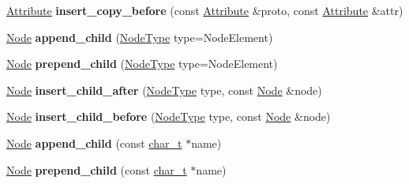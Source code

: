 \begin{DoxyCompactItemize}
\item 
\hypertarget{classphys_1_1xml_1_1Node_af4b5824124e70eda957c410e66123896}{
\hyperlink{classphys_1_1xml_1_1Attribute}{Attribute} {\bfseries insert\_\-copy\_\-before} (const \hyperlink{classphys_1_1xml_1_1Attribute}{Attribute} \&proto, const \hyperlink{classphys_1_1xml_1_1Attribute}{Attribute} \&attr)}
\label{d7/d0a/classphys_1_1xml_1_1Node_af4b5824124e70eda957c410e66123896}

\item 
\hypertarget{classphys_1_1xml_1_1Node_af2601376ae30b9744b3b10067d26de9a}{
\hyperlink{classphys_1_1xml_1_1Node}{Node} {\bfseries append\_\-child} (\hyperlink{namespacephys_1_1xml_a668b0cc666a9d49f7c7222a7552115d3}{NodeType} type=NodeElement)}
\label{d7/d0a/classphys_1_1xml_1_1Node_af2601376ae30b9744b3b10067d26de9a}

\item 
\hypertarget{classphys_1_1xml_1_1Node_ae34bde1d0157fe19996c26099a22695c}{
\hyperlink{classphys_1_1xml_1_1Node}{Node} {\bfseries prepend\_\-child} (\hyperlink{namespacephys_1_1xml_a668b0cc666a9d49f7c7222a7552115d3}{NodeType} type=NodeElement)}
\label{d7/d0a/classphys_1_1xml_1_1Node_ae34bde1d0157fe19996c26099a22695c}

\item 
\hypertarget{classphys_1_1xml_1_1Node_a6c6b4225db38e4f031ee68d5c8c86377}{
\hyperlink{classphys_1_1xml_1_1Node}{Node} {\bfseries insert\_\-child\_\-after} (\hyperlink{namespacephys_1_1xml_a668b0cc666a9d49f7c7222a7552115d3}{NodeType} type, const \hyperlink{classphys_1_1xml_1_1Node}{Node} \&node)}
\label{d7/d0a/classphys_1_1xml_1_1Node_a6c6b4225db38e4f031ee68d5c8c86377}

\item 
\hypertarget{classphys_1_1xml_1_1Node_a36dd60f74bcf0ac054169c3c6ae8e286}{
\hyperlink{classphys_1_1xml_1_1Node}{Node} {\bfseries insert\_\-child\_\-before} (\hyperlink{namespacephys_1_1xml_a668b0cc666a9d49f7c7222a7552115d3}{NodeType} type, const \hyperlink{classphys_1_1xml_1_1Node}{Node} \&node)}
\label{d7/d0a/classphys_1_1xml_1_1Node_a36dd60f74bcf0ac054169c3c6ae8e286}

\item 
\hypertarget{classphys_1_1xml_1_1Node_aae3d925cc040d9fddfe173410bcdd322}{
\hyperlink{classphys_1_1xml_1_1Node}{Node} {\bfseries append\_\-child} (const \hyperlink{namespacephys_1_1xml_afc87705cd1c2917d87b879715a2d8f6e}{char\_\-t} $\ast$name)}
\label{d7/d0a/classphys_1_1xml_1_1Node_aae3d925cc040d9fddfe173410bcdd322}

\item 
\hypertarget{classphys_1_1xml_1_1Node_ab6e8a5ec035a2b66a3d0475498012f3d}{
\hyperlink{classphys_1_1xml_1_1Node}{Node} {\bfseries prepend\_\-child} (const \hyperlink{namespacephys_1_1xml_afc87705cd1c2917d87b879715a2d8f6e}{char\_\-t} $\ast$name)}
\label{d7/d0a/classphys_1_1xml_1_1Node_ab6e8a5ec035a2b66a3d0475498012f3d}


\end{DoxyCompactItemize}
